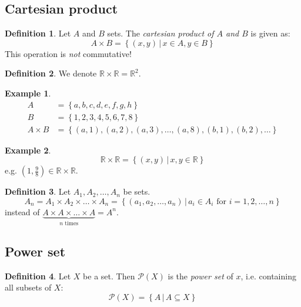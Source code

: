 \documentclass[a4paper,landscape,twocolumn]{article}
\theoremstyle{definition}
\newtheorem{defi}{Definition}
\newtheorem{ex}{Example}
\newcommand\set[1]{\left\{#1\right\}}
\newcommand\setdef[2]{\left\{#1\,|\,#2\right\}}
\begin{document}
\subsection{Cartesian product}
\begin{defi}
  Let $A$ and $B$ sets. The \emph{cartesian product of $A$ and $B$} is given as:
  \[ A \times B = \setdef{(x, y)}{x \in A, y \in B} \]
  This operation is \emph{not} commutative!
\end{defi}

\begin{defi}
  We denote $\mathbb R \times \mathbb R = \mathbb R^2$.
\end{defi}

\begin{ex}
  \begin{align*}
    A &= \set{a, b, c, d, e, f, g, h} \\
    B &= \set{1, 2, 3, 4, 5, 6, 7, 8} \\
    A \times B &= \set{(a, 1), (a, 2), (a, 3), \dots, (a, 8), (b, 1), (b, 2), \dots}
  \end{align*}
\end{ex}

\begin{ex}
  \[ \mathbb R \times \mathbb R = \setdef{(x, y)}{x, y \in \mathbb R} \]
  e.g. $(1, \frac98) \in \mathbb R \times \mathbb R$.
\end{ex}

\begin{defi}
  Let $A_1, A_2, \dots, A_n$ be sets.
  \[ A_n = A_1 \times A_2 \times \dots \times A_n = \setdef{(a_1, a_2, \dots, a_n)}{a_i \in A_i \text{ for } i = 1, 2, \dots, n} \]
  instead of $\underbrace{A \times A \times \dots \times A}_{n \text{ times}} = A^n$.
\end{defi}

\subsection{Power set}
\begin{defi}
  Let $X$ be a set. Then $\mathcal P(X)$ is the \emph{power set} of $x$,
  i.e. containing all subsets of $X$:
  \[ \mathcal P(X) = \setdef{A}{A \subseteq X} \]
\end{defi}
\end{document}
